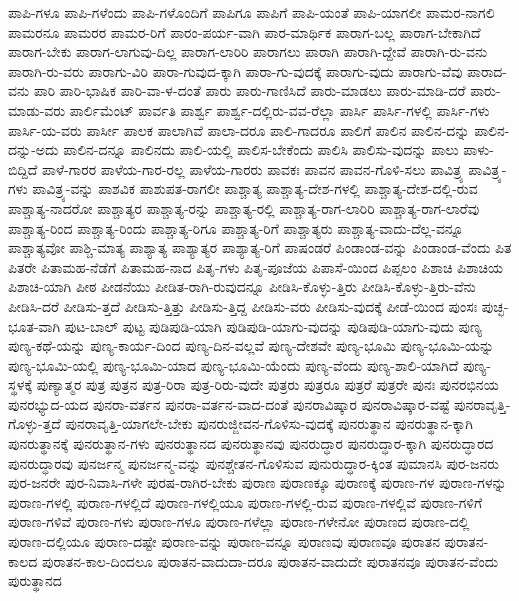 {ಪಾಪಿ-ಗಳೂ
ಪಾಪಿ-ಗಳೆಂದು
ಪಾಪಿ-ಗಳೊಂದಿಗೆ
ಪಾಪಿಗೂ
ಪಾಪಿಗೆ
ಪಾಪಿ-ಯಂತೆ
ಪಾಪಿ-ಯಾಗಲೀ
ಪಾಮರ-ನಾಗಲಿ
ಪಾಮರನೂ
ಪಾಮರರ
ಪಾಮರ-ರಿಗೆ
ಪಾರಂ-ಪರ್ಯ-ವಾಗಿ
ಪಾರ-ಮಾರ್ಥಿಕ
ಪಾರಾಗ-ಬಲ್ಲ
ಪಾರಾಗ-ಬೇಕಾಗಿದೆ
ಪಾರಾಗ-ಬೇಕು
ಪಾರಾಗ-ಲಾಗುವು-ದಿಲ್ಲ
ಪಾರಾಗ-ಲಾರಿರಿ
ಪಾರಾಗಲು
ಪಾರಾಗಿ
ಪಾರಾಗಿ-ದ್ದೇವೆ
ಪಾರಾಗಿ-ರು-ವನು
ಪಾರಾಗಿ-ರು-ವರು
ಪಾರಾಗು-ವಿರಿ
ಪಾರಾ-ಗುವುದ-ಕ್ಕಾಗಿ
ಪಾರಾ-ಗು-ವುದಕ್ಕೆ
ಪಾರಾಗು-ವುದು
ಪಾರಾಗು-ವೆವು
ಪಾರಾದ-ವನು
ಪಾರಿ
ಪಾರಿ-ಭಾಷಿಕ
ಪಾರಿ-ವಾ-ಳ-ದಂತೆ
ಪಾರು
ಪಾರು-ಗಾಣಿಸಿದೆ
ಪಾರು-ಮಾಡಲು
ಪಾರು-ಮಾಡಿ-ದರೆ
ಪಾರು-ಮಾಡು-ವರು
ಪಾರ್ಲಿಮೆಂಟ್
ಪಾರ್ವತಿ
ಪಾರ್ಶ್ವ
ಪಾರ್ಶ್ವ-ದಲ್ಲಿರು-ವವ-ರೆಲ್ಲಾ
ಪಾರ್ಸಿ
ಪಾರ್ಸಿ-ಗಳಲ್ಲಿ
ಪಾರ್ಸಿ-ಗಳು
ಪಾರ್ಸಿ-ಯ-ವರು
ಪಾರ್ಸೀ
ಪಾಲಕ
ಪಾಲಾಗಿವೆ
ಪಾಲಾ-ದರೂ
ಪಾಲಿ-ಗಾದರೂ
ಪಾಲಿಗೆ
ಪಾಲಿನ
ಪಾಲಿನ-ದನ್ನು
ಪಾಲಿನ-ದನ್ನು-ಅದು
ಪಾಲಿನ-ದನ್ನೂ
ಪಾಲಿನದು
ಪಾಲಿ-ಯಲ್ಲಿ
ಪಾಲಿಸ-ಬೇಕೆಂದು
ಪಾಲಿಸಿ
ಪಾಲಿಸು-ವುದನ್ನು
ಪಾಲು
ಪಾಳು-ಬಿದ್ದಿದೆ
ಪಾಳೆ-ಗಾರರ
ಪಾಳೆಯ-ಗಾರ-ರಲ್ಲ
ಪಾಳೆಯ-ಗಾರರು
ಪಾವಕಃ
ಪಾವನ
ಪಾವನ-ಗೊಳಿ-ಸಲು
ಪಾವಿತ್ರ್ಯ
ಪಾವಿತ್ರ್ಯ-ಗಳು
ಪಾವಿತ್ರ್ಯ-ವನ್ನು
ಪಾಶವಿಕ
ಪಾಶುಪತ-ರಾಗಲೀ
ಪಾಶ್ಚಾತ್ಯ
ಪಾಶ್ಚಾತ್ಯ-ದೇಶ-ಗಳಲ್ಲಿ
ಪಾಶ್ಚಾತ್ಯ-ದೇಶ-ದಲ್ಲಿ-ರುವ
ಪಾಶ್ಚಾತ್ಯ-ನಾದರೋ
ಪಾಶ್ಚಾತ್ಯರ
ಪಾಶ್ಚಾತ್ಯ-ರನ್ನು
ಪಾಶ್ಚಾತ್ಯ-ರಲ್ಲಿ
ಪಾಶ್ಚಾತ್ಯ-ರಾಗ-ಲಾರಿರಿ
ಪಾಶ್ಚಾತ್ಯ-ರಾಗ-ಲಾರೆವು
ಪಾಶ್ಚಾತ್ಯ-ರಿಂದ
ಪಾಶ್ಚಾತ್ಯ-ರಿಂದು
ಪಾಶ್ಚಾತ್ಯ-ರಿಗೂ
ಪಾಶ್ಚಾತ್ಯ-ರಿಗೆ
ಪಾಶ್ಚಾತ್ಯರು
ಪಾಶ್ಚಾತ್ಯ-ವಾದು-ದೆಲ್ಲ-ವನ್ನೂ
ಪಾಶ್ಚಾತ್ಯವೋ
ಪಾಶ್ಚಿ-ಮಾತ್ಯ
ಪಾಶ್ಯಾತ್ಯ
ಪಾಶ್ಯಾತ್ಯರ
ಪಾಶ್ಯಾತ್ಯ-ರಿಗೆ
ಪಾಷಂಡರೆ
ಪಿಂಡಾಂಡ-ವನ್ನು
ಪಿಂಡಾಂಡ-ವೆಂದು
ಪಿತ
ಪಿತರೇ
ಪಿತಾಮಹ-ನೆಡೆಗೆ
ಪಿತಾಮಹ-ನಾದ
ಪಿತೃ-ಗಳು
ಪಿತೃ-ಪೂಜೆಯ
ಪಿಪಾಸೆ-ಯಿಂದ
ಪಿಪ್ಪಲಂ
ಪಿಶಾಚಿ
ಪಿಶಾಚಿಯ
ಪಿಶಾಚಿ-ಯಾಗಿ
ಪೀಠ
ಪೀಡನೆಯು
ಪೀಡಿತ-ರಾಗಿ-ರುವುದನ್ನೂ
ಪೀಡಿಸಿ-ಕೊಳ್ಳು-ತ್ತಿರು
ಪೀಡಿಸಿ-ಕೊಳ್ಳು-ತ್ತಿರು-ವೆನು
ಪೀಡಿಸಿ-ದರೆ
ಪೀಡಿಸು-ತ್ತದೆ
ಪೀಡಿಸು-ತ್ತಿತ್ತು
ಪೀಡಿಸು-ತ್ತಿದ್ದ
ಪೀಡಿಸು-ವರು
ಪೀಡಿಸು-ವುದಕ್ಕೆ
ಪೀಡೆ-ಯಿಂದ
ಪುಂಸಃ
ಪುಚ್ಛ-ಭೂತ-ವಾಗಿ
ಪುಟ-ಬಾಲ್
ಪುಟ್ಟ
ಪುಡಿಪುಡಿ-ಯಾಗಿ
ಪುಡಿಪುಡಿ-ಯಾಗು-ವುದನ್ನು
ಪುಡಿಪುಡಿ-ಯಾಗು-ವುದು
ಪುಣ್ಯ
ಪುಣ್ಯ-ಕಥೆ-ಯನ್ನು
ಪುಣ್ಯ-ಕಾರ್ಯ-ದಿಂದ
ಪುಣ್ಯ-ದಿನ-ವಲ್ಲವೆ
ಪುಣ್ಯ-ದೇಶವೇ
ಪುಣ್ಯ-ಭೂಮಿ
ಪುಣ್ಯ-ಭೂಮಿ-ಯನ್ನು
ಪುಣ್ಯ-ಭೂಮಿ-ಯಲ್ಲಿ
ಪುಣ್ಯ-ಭೂಮಿ-ಯಾದ
ಪುಣ್ಯ-ಭೂಮಿ-ಯೆಂದು
ಪುಣ್ಯ-ವೆಂದು
ಪುಣ್ಯ-ಶಾಲಿ-ಯಾಗಿದೆ
ಪುಣ್ಯ-ಸ್ಥಳಕ್ಕೆ
ಪುಣ್ಯಾತ್ಮರ
ಪುತ್ರ
ಪುತ್ರನ
ಪುತ್ರ-ರಿರಾ
ಪುತ್ರ-ರಿರು-ವುದೇ
ಪುತ್ರರು
ಪುತ್ರರೂ
ಪುತ್ರರೆ
ಪುತ್ರರೇ
ಪುನಃ
ಪುನರಭಿನಯ
ಪುನರಭ್ಯುದ-ಯದ
ಪುನರಾ-ವರ್ತನ
ಪುನರಾ-ವರ್ತನ-ವಾದ-ದಂತೆ
ಪುನರಾವಿಷ್ಕಾರ
ಪುನರಾವಿಷ್ಕಾರ-ವಷ್ಟೆ
ಪುನರಾವೃತ್ತಿ-ಗೊಳ್ಳು-ತ್ತದೆ
ಪುನರಾವೃತ್ತಿ-ಯಾಗಲೇ-ಬೇಕು
ಪುನರುಜ್ಜೀವನ-ಗೊಳಿಸು-ವುದಕ್ಕೆ
ಪುನರುತ್ಥಾನ
ಪುನರುತ್ಥಾನ-ಕ್ಕಾಗಿ
ಪುನರುತ್ಥಾನಕ್ಕೆ
ಪುನರುತ್ಥಾನ-ಗಳು
ಪುನರುತ್ಥಾನದ
ಪುನರುತ್ಥಾನವು
ಪುನರುದ್ಧಾರ
ಪುನರುದ್ಧಾರ-ಕ್ಕಾಗಿ
ಪುನರುದ್ಧಾರದ
ಪುನರುದ್ಧಾರವು
ಪುನರ್ಜನ್ಮ
ಪುನರ್ಜನ್ಮ-ವನ್ನು
ಪುನಶ್ಚೇತನ-ಗೊಳಿಸುವ
ಪುನುರುದ್ಧಾರ-ಕ್ಕಿಂತ
ಪುಮಾನಸಿ
ಪುರ-ಜನರು
ಪುರ-ಜನರೇ
ಪುರ-ನಿವಾಸಿ-ಗಳೇ
ಪುರಷ-ರಾಗಿರ-ಬೇಕು
ಪುರಾಣ
ಪುರಾಣಕ್ಕೂ
ಪುರಾಣಕ್ಕೆ
ಪುರಾಣ-ಗಳ
ಪುರಾಣ-ಗಳನ್ನು
ಪುರಾಣ-ಗಳಲ್ಲಿ
ಪುರಾಣ-ಗಳಲ್ಲಿದೆ
ಪುರಾಣ-ಗಳಲ್ಲಿಯೂ
ಪುರಾಣ-ಗಳಲ್ಲಿ-ರುವ
ಪುರಾಣ-ಗಳಲ್ಲಿವೆ
ಪುರಾಣ-ಗಳಿಗೆ
ಪುರಾಣ-ಗಳಿವೆ
ಪುರಾಣ-ಗಳು
ಪುರಾಣ-ಗಳೂ
ಪುರಾಣ-ಗಳೆಲ್ಲಾ
ಪುರಾಣ-ಗಳೇನೋ
ಪುರಾಣದ
ಪುರಾಣ-ದಲ್ಲಿ
ಪುರಾಣ-ದಲ್ಲಿಯೂ
ಪುರಾಣ-ದಷ್ಟೇ
ಪುರಾಣ-ವನ್ನು
ಪುರಾಣ-ವನ್ನೂ
ಪುರಾಣವು
ಪುರಾಣವೂ
ಪುರಾತನ
ಪುರಾತನ-ಕಾಲದ
ಪುರಾತನ-ಕಾಲ-ದಿಂದಲೂ
ಪುರಾತನ-ವಾದುದಾ-ದರೂ
ಪುರಾತನ-ವಾದುದೇ
ಪುರಾತನವೂ
ಪುರಾತನ-ವೆಂದು
ಪುರುತ್ಥಾನದ
}
